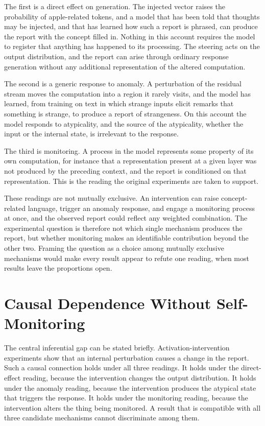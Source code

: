 \documentclass[11pt]{article}
\theoremstyle{definition}
\theoremstyle{remark}
\begin{document}
The first is a direct effect on generation. The injected vector raises the probability of apple-related tokens, and a model that has been told that thoughts may be injected, and that has learned how such a report is phrased, can produce the report with the concept filled in. Nothing in this account requires the model to register that anything has happened to its processing. The steering acts on the output distribution, and the report can arise through ordinary response generation without any additional representation of the altered computation.

The second is a generic response to anomaly. A perturbation of the residual stream moves the computation into a region it rarely visits, and the model has learned, from training on text in which strange inputs elicit remarks that something is strange, to produce a report of strangeness. On this account the model responds to atypicality, and the source of the atypicality, whether the input or the internal state, is irrelevant to the response.

The third is monitoring. A process in the model represents some property of its own computation, for instance that a representation present at a given layer was not produced by the preceding context, and the report is conditioned on that representation. This is the reading the original experiments are taken to support.

These readings are not mutually exclusive. An intervention can raise concept-related language, trigger an anomaly response, and engage a monitoring process at once, and the observed report could reflect any weighted combination. The experimental question is therefore not which single mechanism produces the report, but whether monitoring makes an identifiable contribution beyond the other two. Framing the question as a choice among mutually exclusive mechanisms would make every result appear to refute one reading, when most results leave the proportions open.

\section{Causal Dependence Without Self-Monitoring}

The central inferential gap can be stated briefly. Activation-intervention experiments show that an internal perturbation causes a change in the report. Such a causal connection holds under all three readings. It holds under the direct-effect reading, because the intervention changes the output distribution. It holds under the anomaly reading, because the intervention produces the atypical state that triggers the response. It holds under the monitoring reading, because the intervention alters the thing being monitored. A result that is compatible with all three candidate mechanisms cannot discriminate among them.
\end{document}
